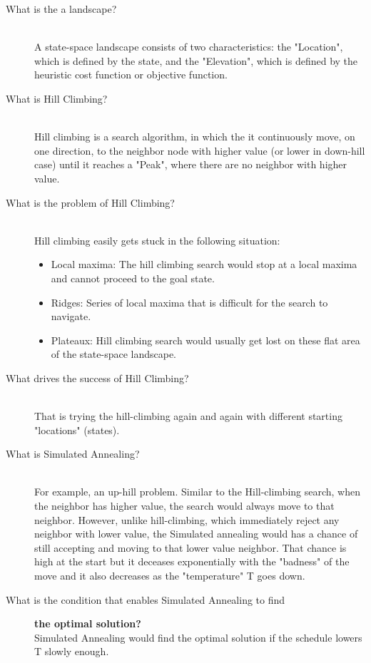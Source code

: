 \documentclass[a4paper, 12pt]{article}
\begin{document}
\begin{enumerate}
\begin{description}
		\item[What is the a landscape?]\hfill \\
			A state-space landscape consists of two characteristics: the "Location", which is defined by the state, and the "Elevation", which is defined by the heuristic cost function or objective function.
			
		\item[What is Hill Climbing?]\hfill \\
			Hill climbing is a search algorithm, in which the it continuously move, on one direction, to the neighbor node with higher value (or lower in down-hill case) until it reaches a "Peak", where there are no neighbor with higher value. 	
		
		\pagebreak
		\item[What is the problem of Hill Climbing?]\hfill \\  
			Hill climbing easily gets stuck in the following situation:
			\begin{itemize}
				\item Local maxima: The hill climbing search would stop at a local maxima and cannot proceed to the goal state.
				\item Ridges: Series of local maxima that is difficult for the search to navigate.
				\item Plateaux: Hill climbing search would usually get lost on these flat area of the state-space landscape.
			\end{itemize}
		
		\item[What drives the success of Hill Climbing?]\hfill \\ 
			That is trying the hill-climbing again and again with different starting "locations" (states).
			
		\item[What is Simulated Annealing?] \hfill \\
			For example, an up-hill problem. Similar to the Hill-climbing search, when the neighbor has higher value, the search would always move to that neighbor. However, unlike hill-climbing, which immediately reject any neighbor with lower value, the Simulated annealing would has a chance of still accepting and moving to that lower value neighbor. That chance is high at the start but it deceases exponentially with the "badness" of the move and it also decreases as the "temperature" T goes down.
			
		\item[What is the condition that enables Simulated Annealing to find]         
		\textbf{the optimal solution?}\hfill\\
			Simulated Annealing would find the optimal solution if the schedule lowers T slowly enough.
		\end{description}
		

\end{enumerate}
\end{document}
